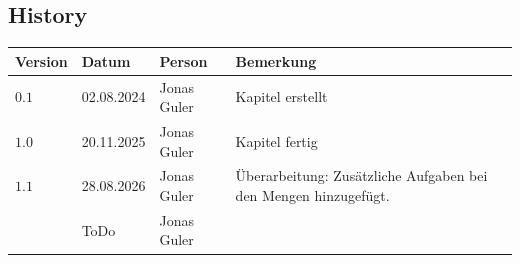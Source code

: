 \documentclass[11pt,oneside]{article}
\begin{document}
\newpage
\subsection*{History}
\begin{table}[H]
    \centering
    \begin{tabular}{|p{13mm}|p{20mm}|p{30mm}|p{70mm}|}\hline
        Version & Datum & Person & Bemerkung \\\hline
        $0.1$ & 02.08.2024 & Jonas Guler & Kapitel erstellt \\\hline
        $1.0$ & 20.11.2025 & Jonas Guler & Kapitel fertig \\\hline
        $1.1$ & 28.08.2026 & Jonas Guler & Überarbeitung: Zusätzliche Aufgaben bei den Mengen hinzugefügt.\\\hline
         & ToDo & Jonas Guler & \\\hline
    \end{tabular}
\end{table}
\end{document}
